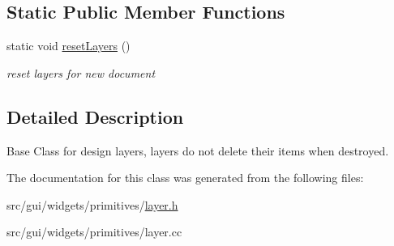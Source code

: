 \subsection*{Static Public Member Functions}
\begin{DoxyCompactItemize}
\item 
static void \hyperlink{classprim_1_1Layer_a572709dd85ef0834cf91883be17b3909}{reset\+Layers} ()\hypertarget{classprim_1_1Layer_a572709dd85ef0834cf91883be17b3909}{}\label{classprim_1_1Layer_a572709dd85ef0834cf91883be17b3909}

\begin{DoxyCompactList}\small\item\em reset layers for new document \end{DoxyCompactList}\end{DoxyCompactItemize}


\subsection{Detailed Description}
Base Class for design layers, layers do not delete their items when destroyed. 

The documentation for this class was generated from the following files\+:\begin{DoxyCompactItemize}
\item 
src/gui/widgets/primitives/\hyperlink{layer_8h}{layer.\+h}\item 
src/gui/widgets/primitives/layer.\+cc\end{DoxyCompactItemize}
